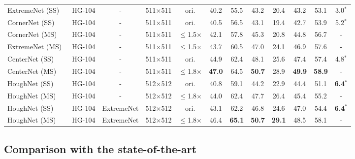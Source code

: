 \documentclass[runningheads]{llncs}
\begin{document}
\begin{table}[H]
{\begin{tabular}{llcccccccccc}
ExtremeNet (SS)~\cite{extremenet} & HG-104 & - &  511$\times$511 & ori. & 40.2 & 55.5 & 43.2 & 20.4 & 43.2 & 53.1  & 3.0$^*$ \\
CornerNet (SS)~\cite{cornernet} & HG-104 & -  & 511$\times$511 & ori.& 40.5 & 56.5 & 43.1 & 19.4 & 42.7 & 53.9 & 5.2$^*$ \\
CornerNet  (MS)~\cite{cornernet}& HG-104 & -  & 511$\times$511 & $\leq$1.5$\times$ & 42.1 & 57.8 & 45.3 & 20.8 & 44.8 & 56.7 & - \\
ExtremeNet (MS)~\cite{extremenet} & HG-104 & - &  511$\times$511 & $\leq$1.5$\times$ & 43.7 & 60.5 & 47.0 & 24.1 & 46.9 & 57.6  & - \\
CenterNet (SS)~\cite{centernet2} & HG-104 & - &  511$\times$511 & ori. & 44.9 & 62.4 & 48.1 & 25.6 &  47.4 & 57.4 & 4.8$^*$ \\
CenterNet (MS)~\cite{centernet2} & HG-104 & - & 511$\times$511 & $\leq$1.8$\times$ &  \textbf{47.0} &  64.5 &  \textbf{50.7} & 28.9 &   \textbf{49.9} &  \textbf{58.9}  & - \\
\midrule HoughNet (SS)& HG-104 & -  & 512$\times$512 & ori. &  40.8 &   59.1 &   44.2 & 22.9 &  44.4 & 51.1 & \textbf{6.4}$^*$ \\
HoughNet (MS)& HG-104 & -  &  512$\times$512 & $\leq$1.8$\times$ & 44.0 &   62.4 &   47.7 & 26.4 &  45.4 & 55.2 & - \\
HoughNet (SS)& HG-104 &  ExtremeNet & 512$\times$512 & ori. &  43.1 & 62.2 & 46.8 & 24.6 &  47.0 & 54.4 & \textbf{6.4}$^*$  \\
HoughNet (MS)& HG-104 &  ExtremeNet &  512$\times$512 & $\leq$1.8$\times$ & 46.4 &  \textbf{65.1} &  \textbf{50.7} &  \textbf{29.1} &  48.5 &58.1 & -  \\
  \bottomrule \end{tabular}}
\label{table:stateoftheart-comp}
\end{table}


\subsection{Comparison with the state-of-the-art}
\label{sec:sota}
\end{document}
